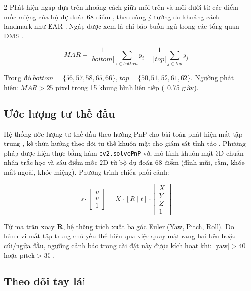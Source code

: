 \documentclass[10pt]{article}
\begin{document}
\begin{multicols}{2}
Phát hiện ngáp dựa trên khoảng cách giữa môi trên và môi dưới từ các điểm mốc miệng của bộ dự đoán 68 điểm \cite{king2009}, theo cùng ý tưởng đo khoảng cách landmark như EAR \cite{soukupova2016}. Ngáp được xem là chỉ báo buồn ngủ trong các tổng quan DMS \cite{ngxande2017}:

\begin{equation}
MAR = \frac{1}{|bottom|} \sum_{i \in bottom} y_i - \frac{1}{|top|} \sum_{j \in top} y_j
\label{eq:mar}
\end{equation}

Trong đó $bottom = \{56,57,58,65,66\}$, $top = \{50,51,52,61,62\}$.
Ngưỡng phát hiện: $MAR > 25$ pixel trong 15 khung hình liên tiếp (~0,75 giây).

\subsection{Ước lượng tư thế đầu}

Hệ thống ước lượng tư thế đầu theo hướng PnP cho bài toán phát hiện mất tập trung \cite{lawson2020}, kế thừa hướng theo dõi tư thế khuôn mặt cho giám sát tỉnh táo \cite{ji2002}. Phương pháp được hiện thực bằng hàm \texttt{cv2.solvePnP} với mô hình khuôn mặt 3D chuẩn nhân trắc học và sáu điểm mốc 2D từ bộ dự đoán 68 điểm \cite{king2009} (đỉnh mũi, cằm, khóe mắt ngoài, khóe miệng). Phương trình chiếu phối cảnh:

\begin{equation}
s \cdot \begin{bmatrix} u \\ v \\ 1 \end{bmatrix} =
K \cdot [R \;|\; t] \cdot \begin{bmatrix} X \\ Y \\ Z \\ 1 \end{bmatrix}
\label{eq:pnp}
\end{equation}

Từ ma trận xoay $\mathbf{R}$, hệ thống trích xuất ba góc Euler (Yaw, Pitch, Roll). Do hành vi mất tập trung chủ yếu thể hiện qua việc quay mặt sang hai bên hoặc cúi/ngửa đầu, ngưỡng cảnh báo trong cài đặt này được kích hoạt khi: $|\text{yaw}| > 40^\circ$ hoặc $\text{pitch} > 35^\circ$.

\subsection{Theo dõi tay lái}


\end{multicols}
\end{document}
